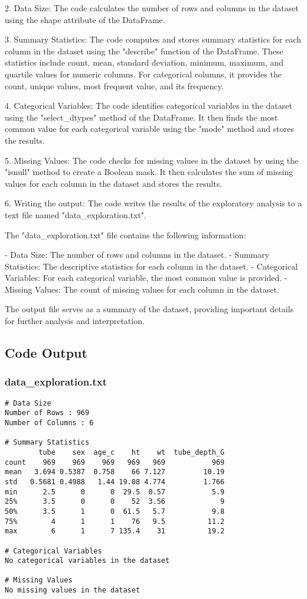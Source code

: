 \documentclass[11pt]{article}
\begin{document}
2. Data Size: The code calculates the number of rows and columns in the dataset using the shape attribute of the DataFrame.

3. Summary Statistics: The code computes and stores summary statistics for each column in the dataset using the "describe" function of the DataFrame. These statistics include count, mean, standard deviation, minimum, maximum, and quartile values for numeric columns. For categorical columns, it provides the count, unique values, most frequent value, and its frequency.

4. Categorical Variables: The code identifies categorical variables in the dataset using the "select\_dtypes" method of the DataFrame. It then finds the most common value for each categorical variable using the "mode" method and stores the results.

5. Missing Values: The code checks for missing values in the dataset by using the "isnull" method to create a Boolean mask. It then calculates the sum of missing values for each column in the dataset and stores the results.

6. Writing the output: The code writes the results of the exploratory analysis to a text file named "data\_exploration.txt". 

The "data\_exploration.txt" file contains the following information:

- Data Size: The number of rows and columns in the dataset.
- Summary Statistics: The descriptive statistics for each column in the dataset.
- Categorical Variables: For each categorical variable, the most common value is provided.
- Missing Values: The count of missing values for each column in the dataset.

The output file serves as a summary of the dataset, providing important details for further analysis and interpretation.

\subsection{Code Output}

\subsubsection*{data\_exploration.txt}

\begin{Verbatim}[tabsize=4]
# Data Size
Number of Rows : 969
Number of Columns : 6

# Summary Statistics
        tube    sex  age_c    ht    wt  tube_depth_G
count    969    969    969   969   969           969
mean   3.694 0.5387  0.758    66 7.127         10.19
std   0.5681 0.4988   1.44 19.08 4.774         1.766
min      2.5      0      0  29.5  0.57           5.9
25%      3.5      0      0    52  3.56             9
50%      3.5      1      0  61.5   5.7           9.8
75%        4      1      1    76   9.5          11.2
max        6      1      7 135.4    31          19.2

# Categorical Variables
No categorical variables in the dataset

# Missing Values
No missing values in the dataset

\end{Verbatim}
\end{document}
